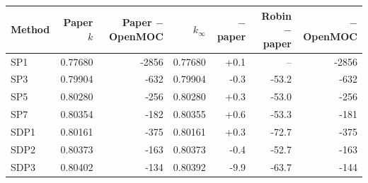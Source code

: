 \begin{tabular}{lrrrrrr}
\hline
Method & Paper $k$ & Paper $-$ OpenMOC & \garnet{} $k_\infty$ & $-$ paper & Robin $-$ paper & \garnet{} $-$ OpenMOC \\
\hline
SP1 & 0.77680 & -2856 & 0.77680 & +0.1 & -- & -2856 \\
SP3 & 0.79904 & -632 & 0.79904 & -0.3 & -53.2 & -632 \\
SP5 & 0.80280 & -256 & 0.80280 & +0.3 & -53.0 & -256 \\
SP7 & 0.80354 & -182 & 0.80355 & +0.6 & -53.3 & -181 \\
SDP1 & 0.80161 & -375 & 0.80161 & +0.3 & -72.7 & -375 \\
SDP2 & 0.80373 & -163 & 0.80373 & -0.4 & -52.7 & -163 \\
SDP3 & 0.80402 & -134 & 0.80392 & -9.9 & -63.7 & -144 \\
\hline
\end{tabular}

